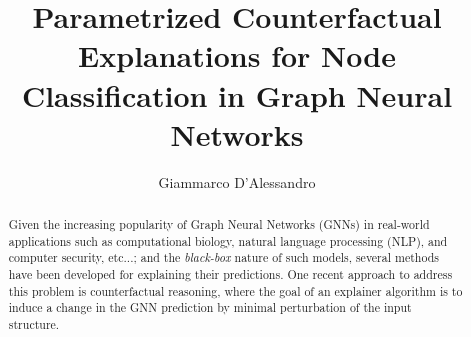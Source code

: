 \documentclass[binding=0.6cm]{sapthesis}
\title{Parametrized Counterfactual Explanations for Node Classification in Graph Neural Networks}
\author{Giammarco D'Alessandro}
\begin{document}
\frontmatter
\maketitle
\dedication{Dedicato a\\Fulmine di Pegasus}


\begin{abstract}
Given the increasing popularity of Graph Neural Networks (GNNs) in real-world applications such as computational biology, natural language processing (NLP), and computer security, etc...; and the \textit{black-box} nature of such models, several methods have been developed for explaining their predictions. One recent approach to address this problem is counterfactual reasoning, where the goal of an explainer algorithm is to induce a change in the GNN prediction by minimal perturbation of the input structure. 



\end{abstract}
\end{document}
